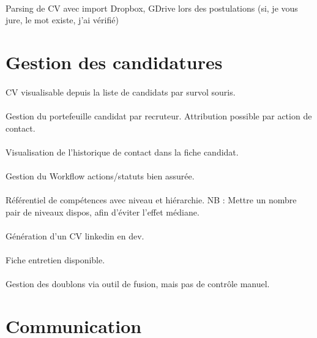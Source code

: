 \paragraph{} Parsing de CV avec import Dropbox, GDrive lors des postulations (si, je vous jure, le mot existe, j'ai vérifié)

\section{Gestion des candidatures}
\paragraph{} CV visualisable depuis la liste de candidats par survol souris.
\paragraph{} Gestion du portefeuille candidat par recruteur. Attribution possible par action de contact.
\paragraph{} Visualisation de l'historique de contact dans la fiche candidat.
\paragraph{} Gestion du Workflow actions/statuts bien assurée.
\paragraph{} Référentiel de compétences avec niveau et hiérarchie. NB : Mettre un nombre pair de niveaux dispos, afin d'éviter l'effet médiane.
\paragraph{} Génération d'un CV linkedin en dev.
\paragraph{} Fiche entretien disponible.
\paragraph{} Gestion des doublons via outil de fusion, mais pas de contrôle manuel.


\section{Communication}
